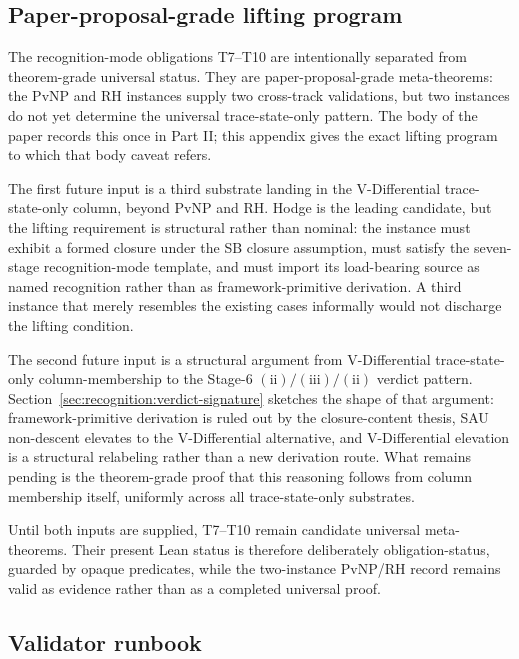 \documentclass[11pt]{article}
\newcommand{\SigPattern}{$\mathrm{(ii)}/\mathrm{(iii)}/\mathrm{(ii)}$}
\theoremstyle{definition}
\begin{document}
\subsection{Paper-proposal-grade lifting program}\label{app:formalization:lifting-program}

The recognition-mode obligations T7--T10 are intentionally separated
from theorem-grade universal status.  They are paper-proposal-grade
meta-theorems: the PvNP and RH instances supply two cross-track
validations, but two instances do not yet determine the universal
trace-state-only pattern.  The body of the paper records this
once in Part II; this appendix gives the exact lifting program to which
that body caveat refers.

The first future input is a third substrate landing in the
V-Differential trace-state-only column, beyond PvNP and RH.  Hodge is
the leading candidate, but the lifting requirement is structural rather
than nominal: the instance must exhibit a formed closure under the SB
closure assumption, must satisfy the seven-stage recognition-mode
template, and must import its load-bearing source as named recognition
rather than as framework-primitive derivation.  A
third instance that merely resembles the existing cases informally would
not discharge the lifting condition.

The second future input is a structural argument from V-Differential
trace-state-only column-membership to the Stage-6 \SigPattern{} verdict
pattern.  Section~\ref{sec:recognition:verdict-signature} sketches the
shape of that argument: framework-primitive derivation is ruled out by
the closure-content thesis, SAU non-descent elevates to the
V-Differential alternative, and V-Differential elevation is a structural
relabeling rather than a new derivation route.  What remains pending is
the theorem-grade proof that this reasoning follows from column
membership itself, uniformly across all trace-state-only substrates.

Until both inputs are supplied, T7--T10 remain candidate universal
meta-theorems.  Their present Lean status is therefore deliberately
obligation-status, guarded by opaque predicates, while the two-instance
PvNP/RH record remains valid as evidence rather than as a completed
universal proof.

\subsection{Validator runbook}\label{app:formalization:validator-runbook}
\end{document}
